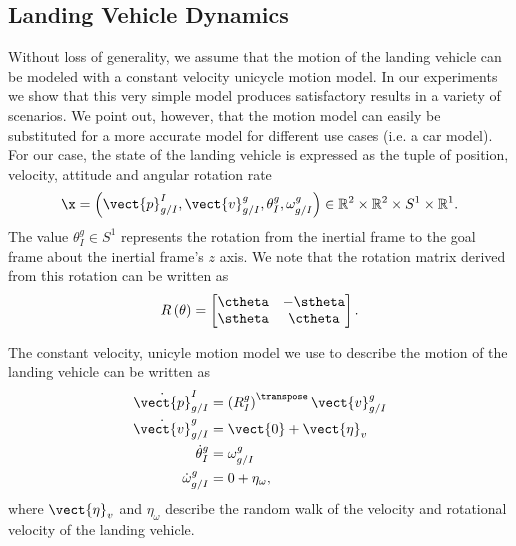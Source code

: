 
\subsection{Landing Vehicle Dynamics}
Without loss of generality, we assume that the motion of the landing vehicle can be modeled with a constant
velocity unicycle motion model. In our experiments we show that this very simple
model produces satisfactory results in a variety of scenarios. We point out,
however, that the motion model can easily be substituted for a more accurate
model for different use cases (i.e. a car model). For our case, the state of the landing vehicle is expressed as the tuple of
position, velocity, attitude and angular rotation rate
\begin{equation*}
  \x =
    \begin{pmatrix}
      \vect{p}_{g/I}^{I}, \vect{v}_{g/I}^{g}, \theta_{I}^{g},
      \omega_{g/I}^{g}
    \end{pmatrix}
    \in
    \mathbb{R}^2 \times \mathbb{R}^2 \times S^1 \times \mathbb{R}^1.
\end{equation*}
The value $\theta_{I}^g \in S^1$ represents the rotation from the inertial frame to the
goal frame about the inertial frame's $z$ axis. We note that the rotation matrix
derived from this rotation can be written as
\begin{equation}
  R \left( \theta \right) =
  \begin{bmatrix}
    \ctheta & -\stheta \\
    \stheta & \ctheta
  \end{bmatrix}.
\end{equation}

The constant velocity, unicyle motion model we use to describe the motion of the
landing vehicle can be written as
\begin{align}
  \dot{\vect{p}}_{g/I}^I
  &=
  \left( R_I^g \right)^\transpose \vect{v}_{g/I}^g  \\
  \dot{\vect{v}}_{g/I}^g
  &=
  \vect{0} + \vect{\eta}_v \\
  \dot{\theta}_{I}^g
  &=
  \omega_{g/I}^g \\
  \dot{\omega}_{g/I}^g
  &=
  0 +\eta_\omega,
\end{align}
where $\vect{\eta}_v$ and $\eta_\omega$ describe the random walk of the velocity
and rotational velocity of the landing vehicle.
